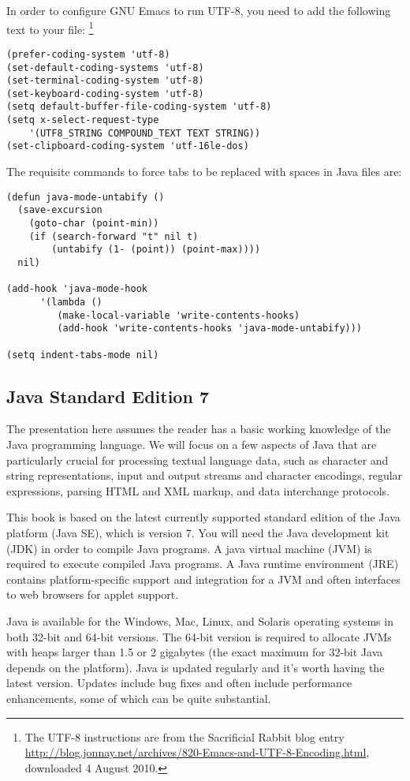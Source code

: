 In order to configure GNU Emacs to run UTF-8, you need to add
the following text to your  file:%
%
\footnote{The UTF-8 instructions are from the Sacrificial Rabbit blog entry
  \url{http://blog.jonnay.net/archives/820-Emacs-and-UTF-8-Encoding.html},
  downloaded 4 August 2010.}
%
\begin{verbatim}
(prefer-coding-system 'utf-8)
(set-default-coding-systems 'utf-8)
(set-terminal-coding-system 'utf-8)
(set-keyboard-coding-system 'utf-8)
(setq default-buffer-file-coding-system 'utf-8)
(setq x-select-request-type 
    '(UTF8_STRING COMPOUND_TEXT TEXT STRING))
(set-clipboard-coding-system 'utf-16le-dos)
\end{verbatim}
%
The requisite commands to force tabs to be replaced with spaces in
Java files are: 
%
\begin{verbatim}
(defun java-mode-untabify ()
  (save-excursion
    (goto-char (point-min))
    (if (search-forward "t" nil t)
        (untabify (1- (point)) (point-max))))
  nil)

(add-hook 'java-mode-hook
      '(lambda ()
         (make-local-variable 'write-contents-hooks)
         (add-hook 'write-contents-hooks 'java-mode-untabify)))

(setq indent-tabs-mode nil)
\end{verbatim}

\subsection{Java Standard Edition 7}

The presentation here assumes the reader has a basic working knowledge
of the Java programming language.  We will focus on a few aspects of
Java that are particularly crucial for processing textual language
data, such as character and string representations, input and output
streams and character encodings, regular expressions, parsing HTML and
XML markup, and data interchange protocols.

This book is based on the latest currently supported standard edition
of the Java platform (Java SE), which is version 7.  You will need the
Java development kit (JDK) in order to compile Java programs.  A java
virtual machine (JVM) is required to execute compiled Java programs.
A Java runtime environment (JRE) contains platform-specific support
and integration for a JVM and often interfaces to web browsers for
applet support.

Java is available for the Windows, Mac, Linux, and Solaris operating
systems in both 32-bit and 64-bit versions.
The 64-bit version
is required to allocate JVMs with heaps larger than 1.5 or 2 gigabytes
(the exact maximum for 32-bit Java depends on the platform).  
Java is updated regularly and it's worth having the latest version.
Updates include bug fixes and often include performance enhancements,
some of which can be quite substantial.

